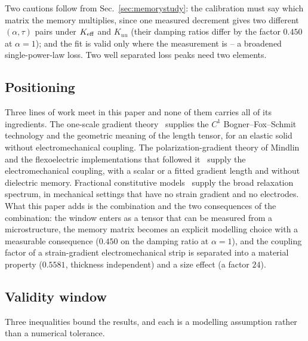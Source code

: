 Two cautions follow from Sec.~\ref{sec:memorystudy}: the calibration must say
which matrix the memory multiplies, since one measured decrement gives two
different $(\alpha,\tau)$ pairs under $K_{\rm eff}$ and $K_{uu}$ (their damping
ratios differ by the factor $0.450$ at $\alpha=1$); and the fit is valid only
where the measurement is -- a broadened single-power-law loss. Two well
separated loss peaks need two elements.

\FloatBarrier
\subsection{Positioning}
\label{sec:positioning}

Three lines of work meet in this paper and none of them carries all of its
ingredients. The one-scale gradient theory~\cite{fem1} supplies the $C^1$
Bogner--Fox--Schmit technology and the geometric meaning of the length tensor,
for an elastic solid without electromechanical coupling. The
polarization-gradient theory of Mindlin~\cite{Mindlin1968} and the
flexoelectric implementations that followed it~\cite{ChenYaoYvonnet2023,
JoshanSantapuri2024,Wang2024PhaseField} supply the electromechanical coupling,
with a scalar or a fitted gradient length and without dielectric memory.
Fractional constitutive models~\cite{BagleyTorvik1983,Koeller1984,
EnelundLesieutre1999} supply the broad relaxation spectrum, in mechanical
settings that have no strain gradient and no electrodes. What this paper adds
is the combination and the two consequences of the combination: the window
enters as a tensor that can be measured from a microstructure, the memory
matrix becomes an explicit modelling choice with a measurable consequence
($0.450$ on the damping ratio at $\alpha=1$), and the coupling factor of a
strain-gradient electromechanical strip is separated into a material property
($0.5581$, thickness independent) and a size effect (a factor $24$).

\FloatBarrier
\subsection{Validity window}
\label{sec:limit_window}

Three inequalities bound the results, and each is a modelling assumption rather
than a numerical tolerance.


